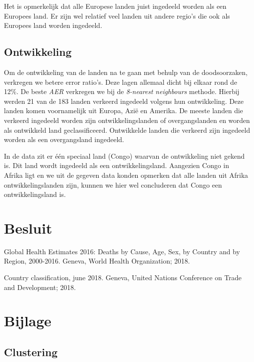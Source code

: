 \documentclass[a4paper,kulak]{kulakarticle}
\begin{document}
Het is opmerkelijk dat alle Europese landen juist ingedeeld worden als een Europees land. Er zijn wel relatief veel landen uit andere regio's die ook als Europees land worden ingedeeld. 

\subsection{Ontwikkeling}
Om de ontwikkeling van de landen na te gaan met behulp van de doodsoorzaken, verkregen we betere error ratio's. Deze lagen allemaal dicht bij elkaar rond de 12\%. De beste \textit{AER} verkregen we bij de \textit{8-nearest neighbours} methode. Hierbij werden 21 van de 183 landen verkeerd ingedeeld volgens hun ontwikkeling. Deze landen komen voornamelijk uit Europa, Azi\"e en Amerika. De meeste landen die verkeerd ingedeeld worden zijn ontwikkelingslanden of overgangslanden en worden als ontwikkeld land geclassificeerd. Ontwikkelde landen die verkeerd zijn ingedeeld worden als een overgangsland ingedeeld. 

In de data zit er \'e\'en speciaal land (Congo) waarvan de ontwikkeling niet gekend is. Dit land wordt ingedeeld als een ontwikkelingsland. Aangezien Congo in Afrika ligt en we uit de gegeven data konden opmerken dat alle landen uit Afrika ontwikkelingslanden zijn, kunnen we hier wel concluderen dat Congo een ontwikkelingsland is. 


\section*{Besluit}



\begin{thebibliography}{9}
	
	Global Health Estimates 2016: Deaths by Cause, Age, Sex, by Country and by Region, 2000-2016.
	Geneva, World Health Organization; 2018.
	
	Country classification, june 2018. Geneva, United Nations Conference on Trade and Development;
	2018.
	
\end{thebibliography}

\newpage
\section{Bijlage} \label{b}
\subsection{Clustering}
\end{document}
